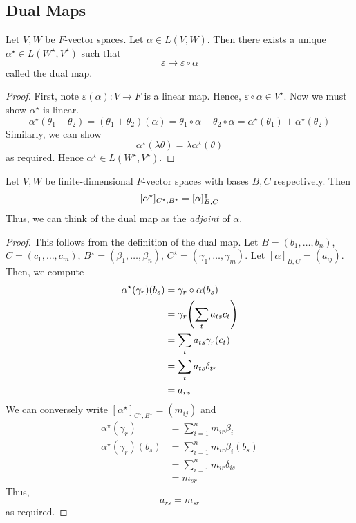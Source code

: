 \subsection{Dual Maps}
\begin{lemma}
	Let \( V, W \) be \( F \)-vector spaces.
	Let \( \alpha \in L(V,W) \).
	Then there exists a unique \( \alpha^\star \in L(W^\star, V^\star) \) such that
	\[ \varepsilon \mapsto \varepsilon \circ \alpha \]
	called the dual map.
\end{lemma}
\begin{proof}
	First, note \( \varepsilon(\alpha) \colon V \to F \) is a linear map.
	Hence, \( \varepsilon \circ \alpha \in V^\star \).
	Now we must show \( \alpha^\star \) is linear.
	\[ \alpha^\star(\theta_1 + \theta_2) = (\theta_1 + \theta_2)(\alpha) = \theta_1 \circ \alpha + \theta_2 \circ \alpha = \alpha^\star(\theta_1) + \alpha^\star(\theta_2) \]
	Similarly, we can show
	\[ \alpha^\star(\lambda \theta) = \lambda \alpha^\star(\theta) \]
	as required.
	Hence \( \alpha^\star \in L(W^\star, V^\star) \).
\end{proof}
\begin{proposition}
	Let \( V, W \) be finite-dimensional \( F \)-vector spaces with bases \( B, C \) respectively.
	Then
	\[ [\alpha^\star]_{C^\star, B^\star} = [\alpha]^\intercal_{B, C} \]
	Thus, we can think of the dual map as the \textit{adjoint} of \( \alpha \).
\end{proposition}
\begin{proof}
	This follows from the definition of the dual map.
	Let \( B = (b_1, \dots, b_n) \), \( C = (c_1, \dots, c_m) \), \( B^\star = (\beta_1, \dots, \beta_n) \), \( C^\star = (\gamma_1, \dots, \gamma_m) \).
	Let \( [\alpha]_{B,C} = (a_{ij}) \).
	Then, we compute
	\begin{align*}
		\alpha^\star(\gamma_r)(b_s) &= \gamma_r \circ \alpha(b_s) \\
		&= \gamma_r \qty( \sum_t a_{ts} c_t ) \\
		&= \sum_t a_{ts} \gamma_r(c_t) \\
		&= \sum_t a_{ts} \delta_{tr} \\
		&= a_{rs}
	\end{align*}
	We can conversely write \( [\alpha^\star]_{C^\star, B^\star} = (m_{ij}) \) and
	\begin{align*}
		\alpha^\star(\gamma_r) &= \sum_{i=1}^n m_{ir} \beta_i \\
		\alpha^\star(\gamma_r)(b_s) &= \sum_{i=1}^n m_{ir} \beta_i(b_s) \\
		&= \sum_{i=1}^n m_{ir} \delta_{is} \\
		&= m_{sr}
	\end{align*}
	Thus,
	\[ a_{rs} = m_{sr} \]
	as required.
\end{proof}
